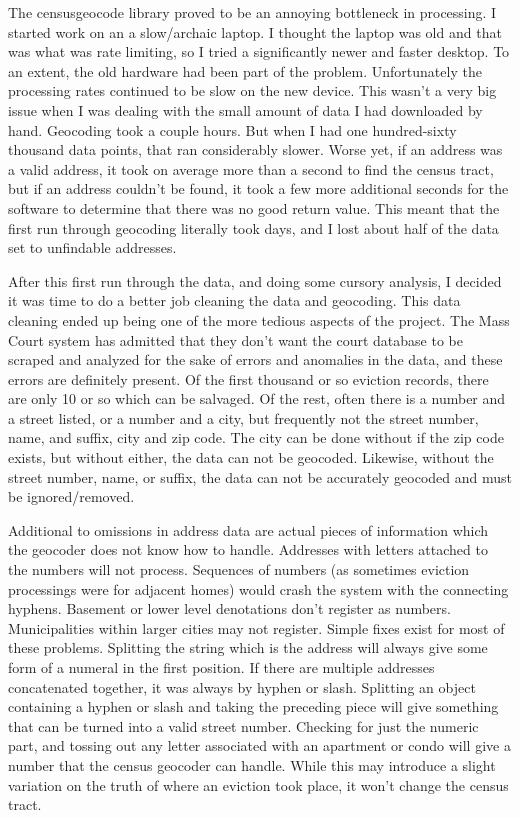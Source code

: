 \par The censusgeocode library proved to be an annoying bottleneck in processing.  I started work on an a slow/archaic laptop.  I thought the laptop was old and that was what was rate limiting, so I tried a significantly newer and faster desktop.  To an extent, the old hardware had been part of the problem.  Unfortunately the processing rates continued to be slow on the new device.  This wasn’t a very big issue when I was dealing with the small amount of data I had downloaded by hand.  Geocoding took a couple hours.  But when I had one hundred-sixty thousand data points, that ran considerably slower.  Worse yet, if an address was a valid address, it took on average more than a second to find the census tract, but if an address couldn’t be found, it took a few more additional seconds for the software to determine that there was no good return value.  This meant that the first run through geocoding literally took days, and I lost about half of the data set to unfindable addresses.

\par After this first run through the data, and doing some cursory analysis, I decided it was time to do a better job cleaning the data and geocoding.  This data cleaning ended up being one of the more tedious aspects of the project.  The Mass Court system has admitted that they don’t want the court database to be scraped and analyzed for the sake of errors and anomalies in the data, and these errors are definitely present.  Of the first thousand or so eviction records, there are only 10 or so which can be salvaged.  Of the rest, often there is a number and a street listed, or a number and a city, but frequently not the street number, name, and suffix, city and zip code.  The city can be done without if the zip code exists, but without either, the data can not be geocoded.  Likewise, without the street number, name, or suffix, the data can not be accurately geocoded and must be ignored/removed.

\par Additional to omissions in address data are actual pieces of information which the geocoder does not know how to handle.  Addresses with letters attached to the numbers will not process.  Sequences of numbers (as sometimes eviction processings were for adjacent homes) would crash the system with the connecting hyphens.  Basement or lower level denotations don't register as numbers.  Municipalities within larger cities may not register.  Simple fixes exist for most of these problems.  Splitting the string which is the address will always give some form of a numeral in the first position.  If there are multiple addresses concatenated together, it was always by hyphen or slash.  Splitting an object containing a hyphen or slash and taking the preceding piece will give something that can be turned into a valid street number.  Checking for just the numeric part, and tossing out any letter associated with an apartment or condo will give a number that the census geocoder can handle.  While this may introduce a slight variation on the truth of where an eviction took place, it won’t change the census tract.


